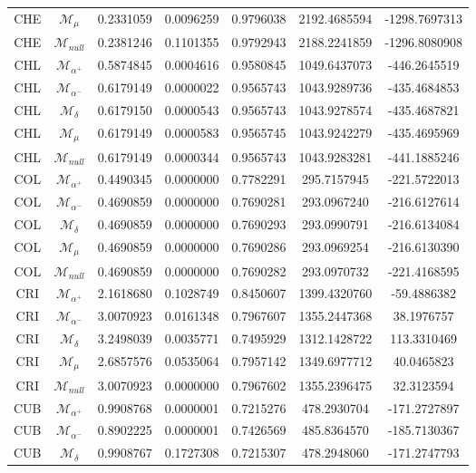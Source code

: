 \begin{tabular}{ccccccc}
CHE & $\mathcal{M}_{\mu}$ & 0.2331059 & 0.0096259 & 0.9796038 & 2192.4685594 & -1298.7697313\\
CHE & $\mathcal{M}_{null}$ & 0.2381246 & 0.1101355 & 0.9792943 & 2188.2241859 & -1296.8080908\\
CHL & $\mathcal{M}_{\alpha^+}$ & 0.5874845 & 0.0004616 & 0.9580845 & 1049.6437073 & -446.2645519\\
CHL & $\mathcal{M}_{\alpha^-}$ & 0.6179149 & 0.0000022 & 0.9565743 & 1043.9289736 & -435.4684853\\
CHL & $\mathcal{M}_{\delta}$ & 0.6179150 & 0.0000543 & 0.9565743 & 1043.9278574 & -435.4687821\\
CHL & $\mathcal{M}_{\mu}$ & 0.6179149 & 0.0000583 & 0.9565745 & 1043.9242279 & -435.4695969\\
CHL & $\mathcal{M}_{null}$ & 0.6179149 & 0.0000344 & 0.9565743 & 1043.9283281 & -441.1885246\\
COL & $\mathcal{M}_{\alpha^+}$ & 0.4490345 & 0.0000000 & 0.7782291 & 295.7157945 & -221.5722013\\
COL & $\mathcal{M}_{\alpha^-}$ & 0.4690859 & 0.0000000 & 0.7690281 & 293.0967240 & -216.6127614\\
COL & $\mathcal{M}_{\delta}$ & 0.4690859 & 0.0000000 & 0.7690293 & 293.0990791 & -216.6134084\\
COL & $\mathcal{M}_{\mu}$ & 0.4690859 & 0.0000000 & 0.7690286 & 293.0969254 & -216.6130390\\
COL & $\mathcal{M}_{null}$ & 0.4690859 & 0.0000000 & 0.7690282 & 293.0970732 & -221.4168595\\
CRI & $\mathcal{M}_{\alpha^+}$ & 2.1618680 & 0.1028749 & 0.8450607 & 1399.4320760 & -59.4886382\\
CRI & $\mathcal{M}_{\alpha^-}$ & 3.0070923 & 0.0161348 & 0.7967607 & 1355.2447368 & 38.1976757\\
CRI & $\mathcal{M}_{\delta}$ & 3.2498039 & 0.0035771 & 0.7495929 & 1312.1428722 & 113.3310469\\
CRI & $\mathcal{M}_{\mu}$ & 2.6857576 & 0.0535064 & 0.7957142 & 1349.6977712 & 40.0465823\\
CRI & $\mathcal{M}_{null}$ & 3.0070923 & 0.0000000 & 0.7967602 & 1355.2396475 & 32.3123594\\
CUB & $\mathcal{M}_{\alpha^+}$ & 0.9908768 & 0.0000001 & 0.7215276 & 478.2930704 & -171.2727897\\
CUB & $\mathcal{M}_{\alpha^-}$ & 0.8902225 & 0.0000001 & 0.7426569 & 485.8364570 & -185.7130367\\
CUB & $\mathcal{M}_{\delta}$ & 0.9908767 & 0.1727308 & 0.7215307 & 478.2948060 & -171.2747793\\

\end{tabular}
